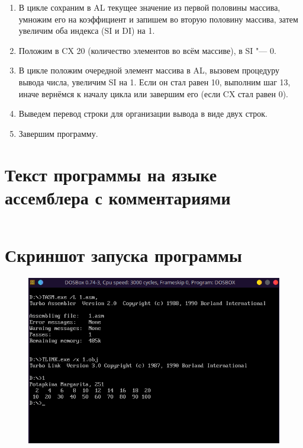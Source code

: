 \documentclass[bachelor, och, otchet]{../SCWorks}
\begin{document}
\begin{enumerate}
\item В цикле сохраним в AL текущее значение из первой половины массива, умножим его на коэффициент и запишем во вторую половину массива, затем увеличим оба индекса (SI и DI) на 1.
\item Положим в CX 20 (количество элементов во всём массиве), в SI "--- 0.
\item В цикле положим очередной элемент массива в AL, вызовем процедуру вывода числа, увеличим SI на 1. Если он стал равен 10, выполним шаг 13, иначе вернёмся к началу цикла или завершим его (если CX стал равен 0).
\item Выведем перевод строки для организации вывода в виде двух строк.
\item Завершим программу.
\end{enumerate}

\section{Текст программы на языке ассемблера с комментариями}
\small
\inputminted{nasm}{1.asm}
\normalsize

\section{Скриншот запуска программы}
\begin{figure}[H]
\centering
\includegraphics[scale=0.9]{1.png}
\end{figure}
\end{document}
